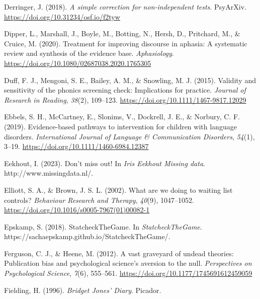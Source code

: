 \documentclass{krantz}
\newlength{\cslhangindent}
\newlength{\cslentryspacingunit} %
\newenvironment{CSLReferences}[2] %
{%
\setlength{\parindent}{0pt}
\ifodd #1
\let\oldpar\par
\def\par{\hangindent=\cslhangindent\oldpar}
\fi
\setlength{\parskip}{#2\cslentryspacingunit}
}%
{}
\begin{document}
\begin{CSLReferences}{1}{0}
\leavevmode{}%
Derringer, J. (2018). \emph{A simple correction for non-independent tests}. {PsyArXiv}. \url{https://doi.org/10.31234/osf.io/f2tyw}

\leavevmode{}%
Dipper, L., Marshall, J., Boyle, M., Botting, N., Hersh, D., Pritchard, M., \& Cruice, M. (2020). Treatment for improving discourse in aphasia: A systematic review and synthesis of the evidence base. \emph{Aphasiology}. \url{https://doi.org/10.1080/02687038.2020.1765305}

\leavevmode{}%
Duff, F. J., Mengoni, S. E., Bailey, A. M., \& Snowling, M. J. (2015). Validity and sensitivity of the phonics screening check: Implications for practice. \emph{Journal of Research in Reading}, \emph{38}(2), 109--123. \url{https://doi.org/10.1111/1467-9817.12029}

\leavevmode{}%
Ebbels, S. H., McCartney, E., Slonims, V., Dockrell, J. E., \& Norbury, C. F. (2019). Evidence-based pathways to intervention for children with language disorders. \emph{International Journal of Language \& Communication Disorders}, \emph{54}(1), 3--19. \url{https://doi.org/10.1111/1460-6984.12387}

\leavevmode{}%
Eekhout, I. (2023). {Don't miss out!} In \emph{Iris Eekhout \textbar{} Missing data}. http://www.missingdata.nl/.

\leavevmode{}%
Elliott, S. A., \& Brown, J. S. L. (2002). What are we doing to waiting list controls? \emph{Behaviour Research and Therapy}, \emph{40}(9), 1047--1052. \url{https://doi.org/10.1016/s0005-7967(01)00082-1}

\leavevmode{}%
Epskamp, S. (2018). {StatcheckTheGame}. In \emph{StatcheckTheGame}. https://sachaepskamp.github.io/StatcheckTheGame/.

\leavevmode{}%
Ferguson, C. J., \& Heene, M. (2012). A vast graveyard of undead theories: {Publication} bias and psychological science's aversion to the null. \emph{Perspectives on Psychological Science}, \emph{7}(6), 555--561. \url{https://doi.org/10.1177/1745691612459059}

\leavevmode{}%
Fielding, H. (1996). \emph{Bridget {Jones}' {Diary}}. {Picador}.


\end{CSLReferences}
\end{document}
